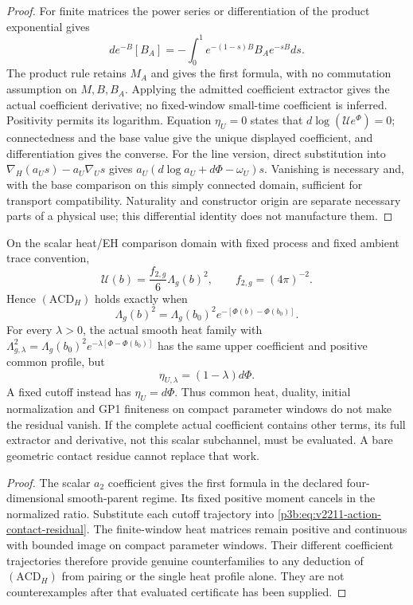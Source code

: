 \documentclass[12pt,a4paper]{article}
\begin{document}
\begin{proof}
For finite matrices the power series or differentiation of the product
exponential gives
\[
 d e^{-B}[B_A]=-\int_0^1e^{-(1-s)B}B_Ae^{-sB}ds.
\]
The product rule retains $M_A$ and gives the first formula, with no
commutation assumption on $M,B,B_A$. Applying the admitted coefficient
extractor gives the actual coefficient derivative; no fixed-window
small-time coefficient is inferred. Positivity permits its logarithm.
Equation $\eta_U=0$ states that
$d\log(\mathcal U e^{\Phi})=0$; connectedness and the base value give the
unique displayed coefficient, and differentiation gives the converse.
For the line version, direct substitution into $\nabla_H(a_Us)-a_U\nabla_Us$
gives $a_U(d\log a_U+d\Phi-\omega_U)s$. Vanishing is necessary and,
with the base comparison on this simply connected domain, sufficient for
transport compatibility. Naturality and constructor origin are separate
necessary parts of a physical use; this differential identity does not
manufacture them.
\end{proof}

\begin{corollary}
\label{p3b:cor:v2211-heat-contact-counterfamily}
On the scalar heat/EH comparison domain with fixed process and fixed
ambient trace convention,
\[
 \mathcal U(b)=\frac{f_{2,g}}6\Lambda_g(b)^2,\qquad
 f_{2,g}=(4\pi)^{-2}.
\]
Hence $(\mathrm{ACD}_H)$ holds exactly when
\[
 \boxed{\Lambda_g(b)^2=\Lambda_g(b_0)^2
 e^{-[\Phi(b)-\Phi(b_0)]}.}
\]
For every $\lambda>0$, the actual smooth heat family with
$\Lambda_{g,\lambda}^2=\Lambda_g(b_0)^2e^{-\lambda[\Phi-\Phi(b_0)]}$
has the same upper coefficient and positive common profile, but
\[
 \eta_{U,\lambda}=(1-\lambda)d\Phi.
\]
A fixed cutoff instead has $\eta_U=d\Phi$. Thus common heat, duality,
initial normalization and GP1 finiteness on compact parameter windows do not
make the residual vanish. If the complete actual coefficient contains other
terms, its full extractor and derivative, not this scalar subchannel, must
be evaluated. A bare geometric contact residue cannot replace that work.
\end{corollary}
\begin{proof}
The scalar $a_2$ coefficient gives the first formula in the declared
four-dimensional smooth-parent regime. Its fixed positive moment cancels in
the normalized ratio. Substitute each cutoff trajectory into
\eqref{p3b:eq:v2211-action-contact-residual}. The finite-window heat matrices
remain positive and continuous with bounded image on compact parameter
windows. Their different coefficient trajectories therefore provide genuine
counterfamilies to any deduction of $(\mathrm{ACD}_H)$ from pairing or the
single heat profile alone. They are not counterexamples after that evaluated
certificate has been supplied.
\end{proof}
\end{document}
